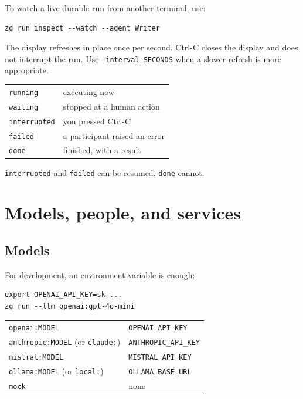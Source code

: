 \documentclass[11pt,a4paper]{article}
\begin{document}
To watch a live durable run from another terminal, use:

\begin{lstlisting}[style=shell]
zg run inspect --watch --agent Writer
\end{lstlisting}

The display refreshes in place once per second. Ctrl-C closes the display and
does not interrupt the run. Use \texttt{--interval SECONDS} when a slower
refresh is more appropriate.

\begin{center}
\begin{tabularx}{0.95\linewidth}{@{}lX@{}}
\toprule
\texttt{running} & executing now \\
\texttt{waiting} & stopped at a human action \\
\texttt{interrupted} & you pressed Ctrl-C \\
\texttt{failed} & a participant raised an error \\
\texttt{done} & finished, with a result \\
\bottomrule
\end{tabularx}
\end{center}

\texttt{interrupted} and \texttt{failed} can be resumed. \texttt{done} cannot.

\section{Models, people, and services}

\subsection{Models}

For development, an environment variable is enough:

\begin{lstlisting}[style=shell]
export OPENAI_API_KEY=sk-...
zg run --llm openai:gpt-4o-mini
\end{lstlisting}

\begin{center}
\begin{tabularx}{0.95\linewidth}{@{}ll@{}}
\toprule
\texttt{openai:MODEL} & \texttt{OPENAI\_API\_KEY} \\
\texttt{anthropic:MODEL} (or \texttt{claude:}) & \texttt{ANTHROPIC\_API\_KEY} \\
\texttt{mistral:MODEL} & \texttt{MISTRAL\_API\_KEY} \\
\texttt{ollama:MODEL} (or \texttt{local:}) & \texttt{OLLAMA\_BASE\_URL} \\
\texttt{mock} & none \\
\bottomrule
\end{tabularx}
\end{center}
\end{document}

